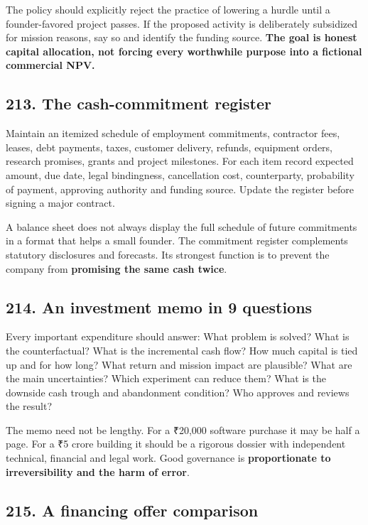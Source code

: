 The policy should explicitly reject the practice of lowering a hurdle until a founder-favored project passes. If the proposed activity is deliberately subsidized for mission reasons, say so and identify the funding source. \textbf{The goal is honest capital allocation, not forcing every worthwhile purpose into a fictional commercial NPV.}

\subsection{213. The cash-commitment register}


Maintain an itemized schedule of employment commitments, contractor fees, leases, debt payments, taxes, customer delivery, refunds, equipment orders, research promises, grants and project milestones. For each item record expected amount, due date, legal bindingness, cancellation cost, counterparty, probability of payment, approving authority and funding source. Update the register before signing a major contract.

A balance sheet does not always display the full schedule of future commitments in a format that helps a small founder. The commitment register complements statutory disclosures and forecasts. Its strongest function is to prevent the company from \textbf{promising the same cash twice}.

\subsection{214. An investment memo in 9 questions}


Every important expenditure should answer: What problem is solved? What is the counterfactual? What is the incremental cash flow? How much capital is tied up and for how long? What return and mission impact are plausible? What are the main uncertainties? Which experiment can reduce them? What is the downside cash trough and abandonment condition? Who approves and reviews the result?

The memo need not be lengthy. For a ₹20,000 software purchase it may be half a page. For a ₹5 crore building it should be a rigorous dossier with independent technical, financial and legal work. Good governance is \textbf{proportionate to irreversibility and the harm of error}.

\subsection{215. A financing offer comparison}


